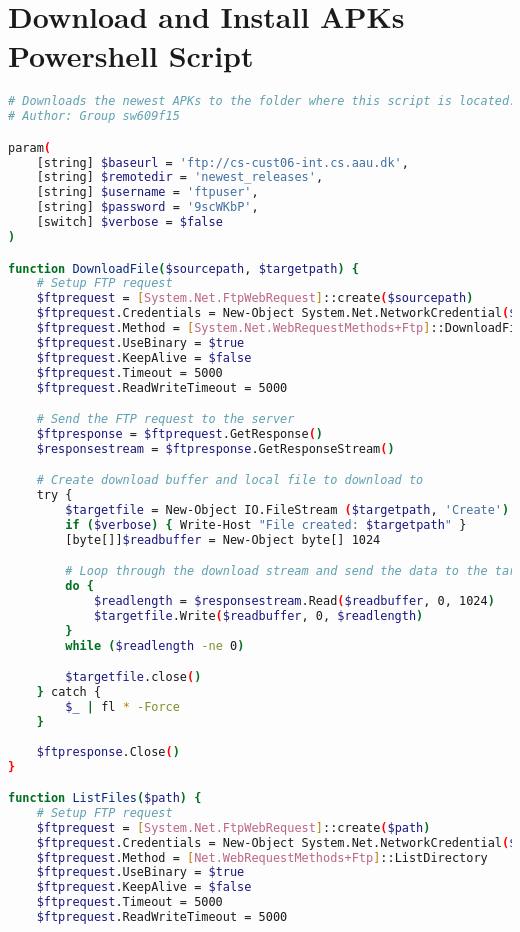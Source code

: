 \chapter{Download and Install APKs Powershell Script}\label{app:download_and_install_apks_windows}
\begin{lstlisting}[language=bash,caption=Powershell script that downloads and installs newest APKs,label=lst:download_install_apks_windows]
# Downloads the newest APKs to the folder where this script is located.
# Author: Group sw609f15

param(
    [string] $baseurl = 'ftp://cs-cust06-int.cs.aau.dk',
    [string] $remotedir = 'newest_releases',
    [string] $username = 'ftpuser',
    [string] $password = '9scWKbP',
    [switch] $verbose = $false
)

function DownloadFile($sourcepath, $targetpath) {
    # Setup FTP request
    $ftprequest = [System.Net.FtpWebRequest]::create($sourcepath)
    $ftprequest.Credentials = New-Object System.Net.NetworkCredential($username, $password)
    $ftprequest.Method = [System.Net.WebRequestMethods+Ftp]::DownloadFile
    $ftprequest.UseBinary = $true
    $ftprequest.KeepAlive = $false
    $ftprequest.Timeout = 5000
    $ftprequest.ReadWriteTimeout = 5000

    # Send the FTP request to the server
    $ftpresponse = $ftprequest.GetResponse()
    $responsestream = $ftpresponse.GetResponseStream()

    # Create download buffer and local file to download to
    try {
        $targetfile = New-Object IO.FileStream ($targetpath, 'Create')
        if ($verbose) { Write-Host "File created: $targetpath" }
        [byte[]]$readbuffer = New-Object byte[] 1024

        # Loop through the download stream and send the data to the target file
        do {
            $readlength = $responsestream.Read($readbuffer, 0, 1024)
            $targetfile.Write($readbuffer, 0, $readlength)
        }
        while ($readlength -ne 0)

        $targetfile.close()
    } catch {
        $_ | fl * -Force
    }
    
    $ftpresponse.Close()
}

function ListFiles($path) {
    # Setup FTP request
    $ftprequest = [System.Net.FtpWebRequest]::create($path)
    $ftprequest.Credentials = New-Object System.Net.NetworkCredential($username, $password)
    $ftprequest.Method = [Net.WebRequestMethods+Ftp]::ListDirectory
    $ftprequest.UseBinary = $true
    $ftprequest.KeepAlive = $false
    $ftprequest.Timeout = 5000
    $ftprequest.ReadWriteTimeout = 5000


\end{lstlisting}
